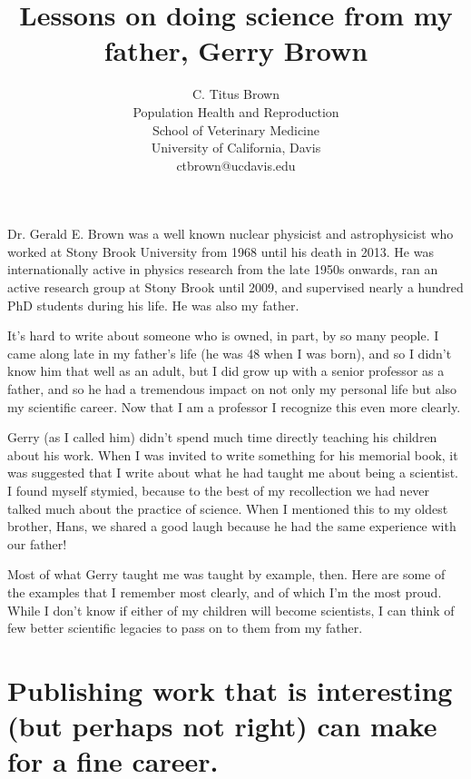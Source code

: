 


\title{Lessons on doing science from my father, Gerry Brown}
\author{C. Titus Brown\\
  Population Health and Reproduction\\
  School of Veterinary Medicine\\
  University of California, Davis\\
  ctbrown@ucdavis.edu}
\maketitle

Dr. Gerald E. Brown was a well known nuclear physicist and
astrophysicist who worked at Stony Brook University from 1968 until
his death in 2013. He was internationally active in physics research
from the late 1950s onwards, ran an active research group at Stony
Brook until 2009, and supervised nearly a hundred PhD students during
his life. He was also my father.

It's hard to write about someone who is owned, in part, by so many
people. I came along late in my father's life (he was 48 when I was
born), and so I didn't know him that well as an adult, but I did grow
up with a senior professor as a father, and so he had a tremendous
impact on not only my personal life but also my scientific career. Now
that I am a professor I recognize this even more clearly.

Gerry (as I called him) didn't spend much time directly teaching his
children about his work.  When I was invited to write something for
his memorial book, it was suggested that I write about what he had
taught me about being a scientist. I found myself stymied, because to
the best of my recollection we had never talked much about the
practice of science. When I mentioned this to my oldest brother, Hans,
we shared a good laugh because he had the same experience with our
father!

Most of what Gerry taught me was taught by example, then. Here are
some of the examples that I remember most clearly, and of which I'm
the most proud. While I don't know if either of my children will
become scientists, I can think of few better scientific legacies to
pass on to them from my father.

\section{Publishing work that is interesting (but perhaps not right) can make
for a fine career.}

